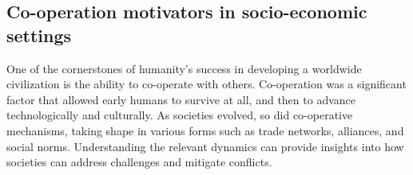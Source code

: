 \documentclass[preprint,12pt,authoryear]{elsarticle}
\begin{document}


\subsection{Co-operation motivators in socio-economic settings}

One of the cornerstones of humanity’s success in developing a worldwide civilization is the ability to co-operate with others. Co-operation was a significant factor that allowed early humans to survive at all, and then to advance technologically and culturally. As societies evolved, so did co-operative mechanisms, taking shape in various forms such as trade networks, alliances, and social norms. Understanding the relevant dynamics can provide insights into how societies can address challenges and mitigate conflicts.
\end{document}
